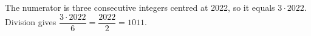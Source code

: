The numerator is three consecutive integers centred at 2022, so it equals $3\cdot2022$. Division gives $\dfrac{3\cdot2022}{6}=\dfrac{2022}{2}=\boxed{1011}$.
